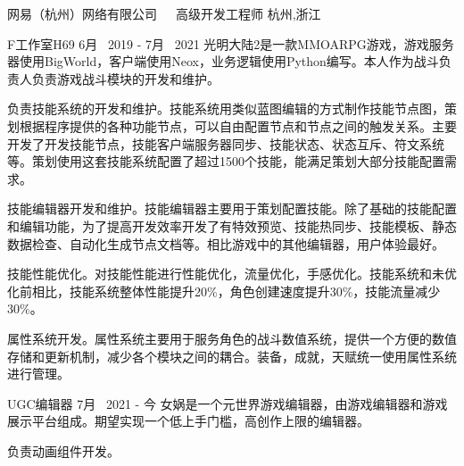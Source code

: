


\begin{cventries}

\cventrycompany
{网易（杭州）网络有限公司~~~高级开发工程师} %
{杭州,浙江} %

\cventryproject
{F工作室H69} %
{6月~ 2019 - 7月~ 2021} %
{光明大陆2是一款MMOARPG游戏，游戏服务器使用BigWorld，客户端使用Neox，业务逻辑使用Python编写。本人作为战斗负责人负责游戏战斗模块的开发和维护。}
{ %
	\begin{cvitems}
		\item {负责技能系统的开发和维护。技能系统用类似蓝图编辑的方式制作技能节点图，策划根据程序提供的各种功能节点，可以自由配置节点和节点之间的触发关系。主要开发了开发技能节点，技能客户端服务器同步、技能状态、状态互斥、符文系统等。策划使用这套技能系统配置了超过1500个技能，能满足策划大部分技能配置需求。}
		\item{技能编辑器开发和维护。技能编辑器主要用于策划配置技能。除了基础的技能配置和编辑功能，为了提高开发效率开发了有特效预览、技能热同步、技能模板、静态数据检查、自动化生成节点文档等。相比游戏中的其他编辑器，用户体验最好。}
		\item{技能性能优化。对技能性能进行性能优化，流量优化，手感优化。技能系统和未优化前相比，技能系统整体性能提升20\%，角色创建速度提升30\%，技能流量减少30\%。}
		\item{属性系统开发。属性系统主要用于服务角色的战斗数值系统，提供一个方便的数值存储和更新机制，减少各个模块之间的耦合。装备，成就，天赋统一使用属性系统进行管理。}
	\end{cvitems}
}

\cventryproject
{UGC编辑器} %
{7月~ 2021 - 今} %
{女娲是一个元世界游戏编辑器，由游戏编辑器和游戏展示平台组成。期望实现一个低上手门槛，高创作上限的编辑器。}
{ %
	\begin{cvitems}
		\item {负责动画组件开发。}
	\end{cvitems}
}


\end{cventries}

